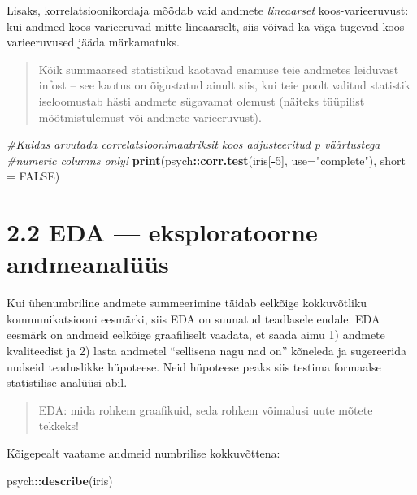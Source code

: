 \documentclass[]{book}
\newenvironment{Shaded}{\begin{snugshade}}{\end{snugshade}}
\newcommand{\KeywordTok}[1]{\textcolor[rgb]{0.13,0.29,0.53}{\textbf{#1}}}
\newcommand{\DataTypeTok}[1]{\textcolor[rgb]{0.13,0.29,0.53}{#1}}
\newcommand{\DecValTok}[1]{\textcolor[rgb]{0.00,0.00,0.81}{#1}}
\newcommand{\StringTok}[1]{\textcolor[rgb]{0.31,0.60,0.02}{#1}}
\newcommand{\CommentTok}[1]{\textcolor[rgb]{0.56,0.35,0.01}{\textit{#1}}}
\newcommand{\OtherTok}[1]{\textcolor[rgb]{0.56,0.35,0.01}{#1}}
\newcommand{\OperatorTok}[1]{\textcolor[rgb]{0.81,0.36,0.00}{\textbf{#1}}}
\newcommand{\NormalTok}[1]{#1}
\begin{document}
Lisaks, korrelatsioonikordaja mõõdab vaid andmete \emph{lineaarset}
koos-varieeruvust: kui andmed koos-varieeruvad mitte-lineaarselt, siis
võivad ka väga tugevad koos-varieeruvused jääda märkamatuks.

\begin{quote}
Kõik summaarsed statistikud kaotavad enamuse teie andmetes leiduvast
infost -- see kaotus on õigustatud ainult siis, kui teie poolt valitud
statistik iseloomustab hästi andmete sügavamat olemust (näiteks
tüüpilist mõõtmistulemust või andmete varieeruvust).
\end{quote}

\begin{Shaded}
\begin{Highlighting}[]
\CommentTok{#Kuidas arvutada correlatsioonimaatriksit koos adjusteeritud p väärtustega}
\CommentTok{#numeric columns only!}
\KeywordTok{print}\NormalTok{(psych}\OperatorTok{::}\KeywordTok{corr.test}\NormalTok{(iris[}\OperatorTok{-}\DecValTok{5}\NormalTok{], }\DataTypeTok{use=}\StringTok{"complete"}\NormalTok{), }\DataTypeTok{short =} \OtherTok{FALSE}\NormalTok{)}
\end{Highlighting}
\end{Shaded}

\section{2.2 EDA --- eksploratoorne
andmeanalüüs}\label{eda-eksploratoorne-andmeanaluus}

Kui ühenumbriline andmete summeerimine täidab eelkõige kokkuvõtliku
kommunikatsiooni eesmärki, siis EDA on suunatud teadlasele endale. EDA
eesmärk on andmeid eelkõige graafiliselt vaadata, et saada aimu 1)
andmete kvaliteedist ja 2) lasta andmetel ``sellisena nagu nad on''
kõneleda ja sugereerida uudseid teaduslikke hüpoteese. Neid hüpoteese
peaks siis testima formaalse statistilise analüüsi abil.

\begin{quote}
EDA: mida rohkem graafikuid, seda rohkem võimalusi uute mõtete tekkeks!
\end{quote}

Kõigepealt vaatame andmeid numbrilise kokkuvõttena:

\begin{Shaded}
\begin{Highlighting}[]
\NormalTok{psych}\OperatorTok{::}\KeywordTok{describe}\NormalTok{(iris)}
\end{Highlighting}
\end{Shaded}
\end{document}
